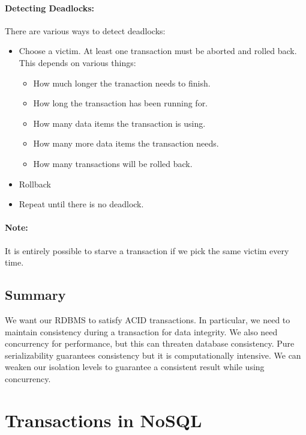 \documentclass{report}
\begin{document}
\paragraph{Detecting Deadlocks:} There are various ways to detect deadlocks:
\begin{itemize}[label=$\to$]
    \item Choose a victim. At least one transaction must be aborted and rolled
        back. This depends on various things:
        \begin{itemize}[label=$\to$]
            \item How much longer the tranaction needs to finish.
            \item How long the transaction has been running for.
            \item How many data items the transaction is using.
            \item How many more data items the transaction needs.
            \item How many transactions will be rolled back.
        \end{itemize}
    \item Rollback
    \item Repeat until there is no deadlock.
\end{itemize}

\paragraph{Note:} It is entirely possible to starve a transaction if we pick the
same victim every time.

\subsection{Summary}
We want our RDBMS to satisfy ACID transactions. In particular, we need to
maintain consistency during a transaction for data integrity. We also need
concurrency for performance, but this can threaten database consistency. Pure
serializability guarantees consistency but it is computationally intensive. We
can weaken our isolation levels to guarantee a consistent result while using
concurrency.

\section{Transactions in NoSQL}
\end{document}
